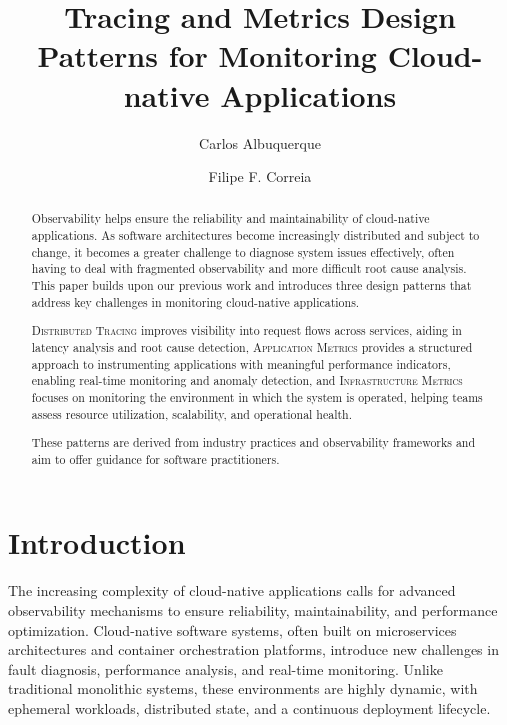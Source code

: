 \documentclass[runningheads]{llncs}
\begin{document}
%
\title{Tracing and Metrics Design Patterns for Monitoring Cloud-native Applications}
%

\author{Carlos Albuquerque \and
Filipe F. Correia} 
%



%
\maketitle
%
\begin{abstract}
Observability helps ensure the reliability and maintainability of cloud-native applications. As software architectures become increasingly distributed and subject to change, it becomes a greater challenge to diagnose system issues effectively, often having to deal with fragmented observability and more difficult root cause analysis. This paper builds upon our previous work and introduces three design patterns that address key challenges in monitoring cloud-native applications.

\textsc{Distributed Tracing} improves visibility into request flows across services, aiding in latency analysis and root cause detection, \textsc{Application Metrics} provides a structured approach to instrumenting applications with meaningful performance indicators, enabling real-time monitoring and anomaly detection, and \textsc{Infrastructure Metrics} focuses on monitoring the environment in which the system is operated, helping teams assess resource utilization, scalability, and operational health.

These patterns are derived from industry practices and observability frameworks and aim to offer guidance for software practitioners. 


\end{abstract}
%

\section{Introduction}
\label{sec:intro}

The increasing complexity of cloud-native applications calls for advanced observability mechanisms to ensure reliability, maintainability, and performance optimization. Cloud-native software systems, often built on microservices architectures and container orchestration platforms, introduce new challenges in fault diagnosis, performance analysis, and real-time monitoring. Unlike traditional monolithic systems, these environments are highly dynamic, with ephemeral workloads, distributed state, and a continuous deployment lifecycle.
\end{document}
